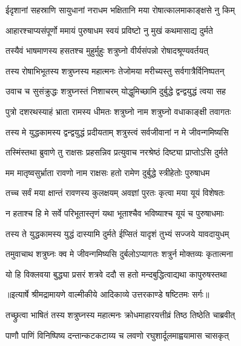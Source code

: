 \twolineshloka
{ईदृशानां सहस्राणि सायुधानां नराधम}
{भक्षितानि मया रोषात्कालमाकाङ्क्षसे नु किम्} %

\twolineshloka
{आहारश्चाप्यसंपूर्णो ममायं पुरुषाधम}
{स्वयं प्रविष्टो नु मुखं कथमासाद्य दुर्मते} %

\twolineshloka
{तस्यैवं भाषमाणस्य हसतश्च मुहुर्मुहुः}
{शत्रुघ्नो वीर्यसंपन्नो रोषादश्रूण्यवर्तयत्} %

\twolineshloka
{तस्य रोषाभिभूतस्य शत्रुघ्नस्य महात्मनः}
{तेजोमया मरीच्यस्तु सर्वगात्रैर्विनिष्पतन्} %

\twolineshloka
{उवाच च सुसंक्रुद्धः शत्रुघ्नस्तं निशाचरम्}
{योद्धुमिच्छामि दुर्बुद्धे द्वन्द्वयुद्धं त्वया सह} %

\twolineshloka
{पुत्रो दशरथस्याहं भ्राता रामस्य धीमतः}
{शत्रुघ्नो नाम शत्रुघ्नो वधाकाङ्क्षी तवागतः} %

\twolineshloka
{तस्य मे युद्धकामस्य द्वन्द्वयुद्धं प्रदीयताम्}
{शत्रुस्त्वं सर्वजीवानां न मे जीवन्गमिष्यसि} %

\twolineshloka
{तस्मिंस्तथा ब्रुवाणे तु राक्षसः प्रहसन्निव}
{प्रत्युवाच नरश्रेष्ठं दिष्ट्या प्राप्तोऽसि दुर्मते} %

\twolineshloka
{मम मातृष्वसुर्भ्राता रावणो नाम राक्षसः}
{हतो रामेण दुर्बुद्धे स्त्रीहेतोः पुरुषाधम} %

\twolineshloka
{तच्च सर्वं मया क्षान्तं रावणस्य कुलक्षयम्}
{अवज्ञां पुरतः कृत्वा मया यूयं विशेषतः} %

\twolineshloka
{न हताश्च हि मे सर्वे परिभूतास्तृणं यथा}
{भूताश्चैव भविष्याश्च यूयं च पुरुषाधमाः} %

\twolineshloka
{तस्य ते युद्धकामस्य युद्धं दास्यामि दुर्मते}
{ईप्सितं यादृशं तुभ्यं सज्जये यावदायुधम्} %

\twolineshloka
{तमुवाचाथ शत्रुघ्नः क्व मे जीवन्गमिष्यसि}
{दुर्बलोऽप्यागतः शत्रुर्न मोक्तव्यः कृतात्मना} %

\twolineshloka
{यो हि विक्लवया बुद्ध्या प्रसरं शत्रवे ददौ}
{स हतो मन्दबुद्धित्वाद्यथा कापुरुषस्तथा} %


{॥इत्यार्षे श्रीमद्रामायणे वाल्मीकीये आदिकाव्ये उत्तरकाण्डे षष्टितमः सर्गः॥}


\twolineshloka
{तच्छ्रुत्वा भाषितं तस्य शत्रुघ्नस्य महात्मनः}
{क्रोधमाहारयत्तीव्रं तिष्ठ तिष्ठेति चाब्रवीत्} %

\twolineshloka
{पाणौ पाणिं विनिष्पिष्य दन्तान्कटकटाय्य च}
{लवणो रघुशार्दूलमाह्वयामास चासकृत्} %

